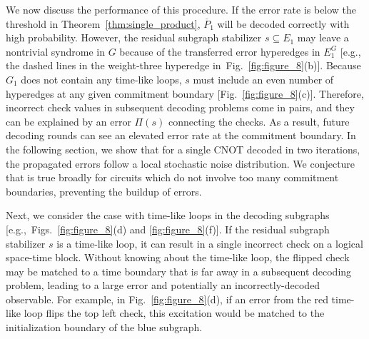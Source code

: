 \documentclass[prx,twocolumn,secnumarabic,balancelastpage,amsmath,amssymb,longbibliography]{revtex4-2}
\newcommand{\lop}[1]{\overline{#1}}
\begin{document}
We now discuss the performance of this procedure.
%
If the error rate is below the threshold in Theorem~\ref{thm:single_product}, $\lop P_1$ will be decoded correctly with high probability.
%
However, the residual subgraph stabilizer $s\subseteq E_1$ may leave a nontrivial syndrome in $G$ because of the transferred error hyperedges in $E^G_1$  [e.g., the dashed lines in the weight-three hyperedge in~Fig.~\ref{fig:figure_8}(b)]. 
%
Because $G_1$ does not contain any time-like loops, $s$ must include an even number of hyperedges at any given commitment boundary [Fig.~\ref{fig:figure_8}(c)]. 
%
Therefore, incorrect check values in subsequent decoding problems come in pairs, and they can be explained by an error $\Pi(s)$ connecting the checks.
%
As a result, future decoding rounds can see an elevated error rate at the commitment boundary. 
%
In the following section, we show that for a single CNOT decoded in two iterations, the propagated errors follow a local stochastic noise distribution. 
%
We conjecture that is true broadly for circuits which do not involve too many commitment boundaries, preventing the buildup of errors. 

Next, we consider the case with time-like loops in the decoding subgraphs [e.g.,~Figs.~\ref{fig:figure_8}(d) and \ref{fig:figure_8}(f)]. 
%
If the residual subgraph stabilizer $s$ is a time-like loop, it can result in a single incorrect check on a logical space-time block. 
%
Without knowing about the time-like loop, the flipped check may be matched to a time boundary that is far away in a subsequent decoding problem, leading to a large error and potentially an incorrectly-decoded observable. 
%
For example, in Fig.~\ref{fig:figure_8}(d), if an error from the red time-like loop flips the top left check, this excitation would be matched to the initialization boundary of the blue subgraph.
\end{document}
